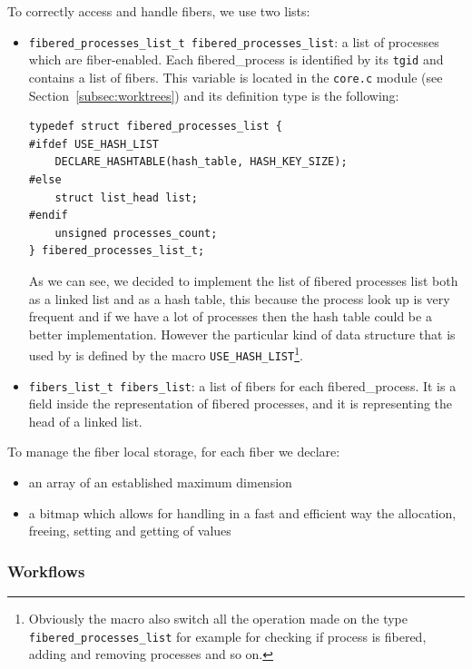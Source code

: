 \documentclass[a4paper,10pt]{article}
\begin{document}
  To correctly access and handle fibers, we use two lists:
  \begin{itemize}
    \item \lstinline{fibered_processes_list_t fibered_processes_list}: a list of processes which are fiber-enabled. Each fibered\_process is identified by its \lstinline{tgid} and contains a list of fibers. This variable is located in the \lstinline{core.c} module (see Section~\ref{subsec:worktrees}) and its definition type is the following:

    \begin{lstlisting}[frame=trBL]
typedef struct fibered_processes_list {
#ifdef USE_HASH_LIST
    DECLARE_HASHTABLE(hash_table, HASH_KEY_SIZE);
#else
    struct list_head list;
#endif
    unsigned processes_count;
} fibered_processes_list_t;
    \end{lstlisting}
    
    As we can see, we decided to implement the list of fibered processes list both as a linked list and as a hash table, this because the process look up is very frequent and if we have a lot of processes then the hash table could be a better implementation. However the particular kind of data structure that is used by is defined by the macro \lstinline{USE_HASH_LIST}\footnote{Obviously the macro also switch all the operation made on the type \lstinline{fibered_processes_list} for example for checking if process is fibered, adding and removing processes and so on.}. 

    \item \lstinline{fibers_list_t fibers_list}: a list of fibers for each fibered\_process. It is a field inside the representation of fibered processes, and it is representing the head of a linked list.
  \end{itemize}

  To manage the fiber local storage, for each fiber we declare:
  \begin{itemize}
    \item an array of an established maximum dimension
    \item a bitmap which allows for handling in a fast and efficient way the allocation, freeing, setting and getting of values
  \end{itemize}

\subsubsection{Workflows}
\end{document}
